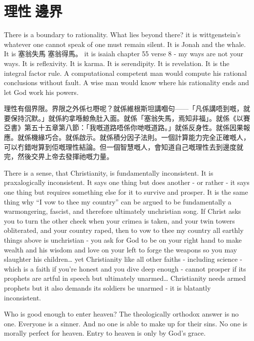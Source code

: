\chapter{理性󱝚邊界}

There is a boundary to rationality. What lies beyond there? it is wittgenstein’s whatever one cannot speak of one must remain silent. It is Jonah and the whale. It is 塞翁失馬 塞翁得馬。 it is isaiah chapter 55 verse 8 - my ways are not your ways. It is reflexivity. It is karma. It is serendipity. It is revelation. It is the integral factor rule. A computational competent man would compute his rational conclusions without fault. A wise man would know where his rationality ends and let God work his powers. 


理性有個界限。界限之外係乜嘢呢？就係維根斯坦講嗰句——「凡係講唔到嘅，就要保持沉默。」就係約拿喺鯨魚肚入面。就係「塞翁失馬，焉知非福」。就係《以賽亞書》第五十五章第八節：「我嘅道路唔係你哋嘅道路。」就係反身性。就係因果報應。就係機緣巧合。就係啟示。就係積分因子法則。一個計算能力完全正確嘅人，可以冇錯咁算到佢嘅理性結論。但一個智慧嘅人，會知道自己嘅理性去到邊度就完，然後交畀上帝去發揮祂嘅力量。



There is a sense, that Christianity, is fundamentally inconsistent. It is praxalogically inconsistent. It says one thing but does another - or rather - it says one thing but requires something else for it to survive and prosper. It is the same thing why “I vow to thee my country” can be argued to be fundamentally a warmongering, fascist, and therefore ultimately unchristian song. If Christ asks you to turn the other cheek when your crimea is taken, and your twin towers obliterated, and your country raped, then to vow to thee my country all earthly things above is unchristian - you ask for God to be on your right hand to make wealth and his wisdom and love on your left to forge the weapons so you may slaughter his children… yet Christianity like all other faiths - including science - which is a faith if you’re honest and you dive deep enough - cannot prosper if its prophets are artful in speech but ultimately unarmed… Christianity needs armed prophets but it also demands its soldiers be unarmed - it is blatantly inconsistent. 


Who is good enough to enter heaven? The theologically orthodox answer is no one. Everyone is a sinner. And no one is able to make up for their sins. No one is morally perfect for heaven. Entry to heaven is only by God’s grace. 

